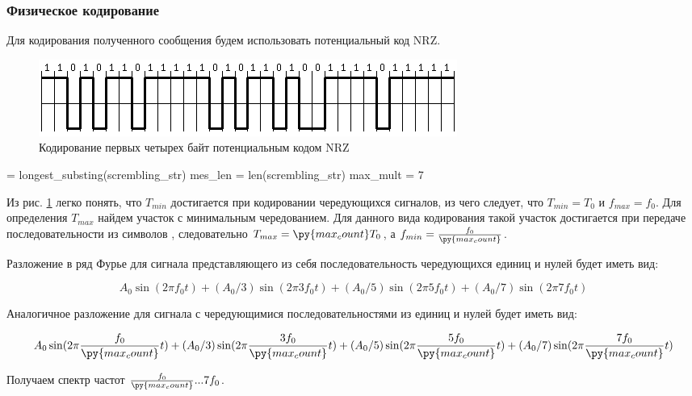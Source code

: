 \documentclass[12pt, a4paper]{article}
\begin{document}
\subsubsection*{Физическое кодирование}

Для кодирования полученного сообщения будем использовать потенциальный код NRZ.

\begin{figure}[h]
  \begin{center}
    \includegraphics{nrz_scr}
    \caption{Кодирование первых четырех байт потенциальным кодом NRZ}
    \label{fig:nrzscr}
  \end{center}
\end{figure}

\begin{pycode}
 = longest_substing(scrembling_str)
mes_len = len(scrembling_str)
max_mult = 7
\end{pycode}

Из рис. \ref{fig:nrzscr} легко понять, что $T_{min}$ достигается при кодировании чередующихся
сигналов, из чего следует, что $T_{min} = T_0$ и $f_{max} = f_0$. Для определения
$T_{max}$ найдем участок с минимальным чередованием. Для данного вида кодирования
такой участок достигается при передаче последовательности из 
символов \texttt{},
следовательно $T_{max} = \py{max_count} T_0$, а $f_{min} = \frac{f_0}{\py{max_count}}$.

Разложение в ряд Фурье для сигнала представляющего из себя последовательность
чередующихся единиц и нулей будет иметь вид:

$$A_0 \sin(2 \pi f_0 t) + (A_0 / 3) \sin(2 \pi 3 f_0 t) +
  (A_0 / 5) \sin(2 \pi 5 f_0 t) + (A_0 / 7) \sin(2 \pi 7 f_0 t)$$

Аналогичное разложение для сигнала с чередующимися последовательностями из
 единиц и нулей будет иметь вид:

$$A_0 \sin(2 \pi \frac{f_0}{\py{max_count}} t) + (A_0 / 3) \sin(2 \pi \frac{3 f_0}{\py{max_count}} t) +
  (A_0 / 5) \sin(2 \pi \frac{5 f_0}{\py{max_count}} t) + (A_0 / 7) \sin(2 \pi \frac{7 f_0}{\py{max_count}} t)$$

Получаем спектр частот $\frac{f_0}{\py{max_count}}...7 f_0$.
\end{document}
